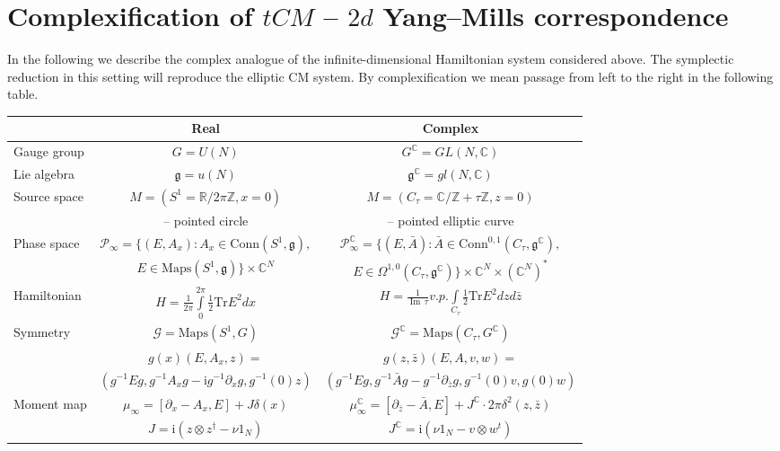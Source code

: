 \documentclass[12pt]{article}
\numberwithin{equation}{section}
\renewcommand{\Im}{{\operatorname{Im}\,}}
\theoremstyle{definition}
\newcommand {\ii} {\mathrm{i}}
\begin{document}
\section{Complexification of $tCM$ -- $2d$ Yang--Mills correspondence}
In the following we describe the complex analogue of the infinite-dimensional Hamiltonian system considered above. The symplectic reduction in this setting will reproduce the elliptic CM system. By complexification we mean passage from left to the right in the following table.
\newpage
\begin{table}[h]
   \label{tab:example}
   \small
   \centering
   \begin{tabular}{l|c|c}
    & \textbf{Real} & \textbf{Complex} \\ 
   \midrule
Gauge group & $G = U(N)$ & $G^{\mathbb{C}} = GL(N, \mathbb{C})$\\
\midrule
Lie algebra & $\mathfrak{g} = u(N)$ & $\mathfrak{g}^{\mathbb{C}} = gl(N, \mathbb{C})$ \\
\midrule
Source space & $M = (S^1 = \mathbb{R}/2 \pi \mathbb{Z} , x = 0)$  & $M = (C_{\tau} = \mathbb{C} / \mathbb{Z} + \tau \mathbb{Z}, z = 0)$  \\
&  -- pointed circle & -- pointed elliptic curve\\
\midrule
Phase space & $\mathcal{P}_{\infty} = \{ (E, A_x): A_x \in \mathrm{Conn}(S^1, \mathfrak{g}),  $ & $\mathcal{P}_{\infty}^{\mathbb{C}} = \{ (E, \bar{A}): \bar{A} \in \mathrm{Conn}^{0, 1}(C_{\tau}, \mathfrak{g}^{\mathbb{C}}), $\\
&$E \in \mathrm{Maps}(S^1 , \mathfrak{g})\} \times \mathbb{C}^N$ & $E \in \Omega^{1, 0}(C_{\tau}, \mathfrak{g}^{\mathbb{C}})\} \times \mathbb{C}^N \times (\mathbb{C}^N)^*$\\
\midrule
Hamiltonian & $H =\frac{1}{2\pi} \int \limits_{0}^{2\pi} \frac{1}{2} \mathrm{Tr} E^2 dx$ & $H =\frac{1}{\Im \tau} v.p. \int\limits_{C_{\tau}} \frac{1}{2} \mathrm{Tr} E^2 dz d \bar{z}$ \\
\midrule
Symmetry & $\mathcal{G} = \mathrm{Maps}(S^1, G)$ & $\mathcal{G}^{\mathbb{C}} = \mathrm{Maps}(C_{\tau}, G^{\mathbb{C}})$ \\
& $g(x)(E, A_x, z) = $ & $g(z, \bar{z}) (E, A, v, w) = $ \\
&$(g^{-1} E g, g^{-1} A_{x} g - {\ii} g^{-1} \partial_{x} g, g^{-1}(0)z)$&$(g^{-1} E g, g^{-1} \bar{A} g - g^{-1} \partial_{\bar{z}} g, g^{-1}(0) v, g(0)w )$\\
\midrule
Moment map &$\mu_{\infty} = [\partial_{x} - A_x , E] + J \delta (x)$& $\mu_{\infty}^{\mathbb{C}} = [\partial_{\bar{z}} - \bar{A}, E] + J^{\mathbb{C}} \cdot 2\pi \delta^{2}(z, \bar{z})$\\
&$J = {\ii} (z \otimes z^{\dagger} - \nu 1_{N})$& $J^{\mathbb{C}} = {\ii} (\nu 1_{N} - v \otimes w^{t})$
   \end{tabular}
\end{table}
\end{document}
